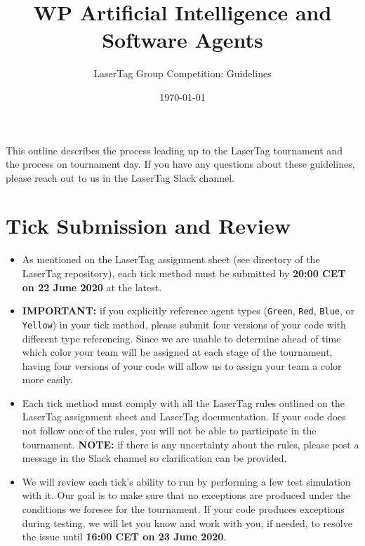 \documentclass[
    a4paper,
    english,
    DIV=16,
    11pt,
    parskip=half,
]{scrartcl}
\title{WP Artificial Intelligence and Software Agents}
\subtitle{LaserTag Group Competition: Guidelines}
\date{\today}
\begin{document}
\maketitle

This outline describes the process leading up to the LaserTag tournament and the process on tournament day. If you have any questions about these guidelines, please reach out to us in the LaserTag Slack channel.

\section*{Tick Submission and Review}
\begin{itemize}
    \item As mentioned on the LaserTag assignment sheet (see  directory of the LaserTag repository), each tick method must be submitted by \textbf{20:00 CET on 22 June 2020} at the latest.
    \item \textbf{IMPORTANT:} if you explicitly reference agent types (\texttt{Green}, \texttt{Red}, \texttt{Blue}, or \texttt{Yellow}) in your tick method, please submit four versions of your code with different type referencing. Since we are unable to determine ahead of time which color your team will be assigned at each stage of the tournament, having four versions of your code will allow us to assign your team a color more easily.
    \item Each tick method must comply with all the LaserTag rules outlined on the LaserTag assignment sheet and LaserTag documentation. If your code does not follow one of the rules, you will not be able to participate in the tournament. \textbf{NOTE:} if there is any uncertainty about the rules, please post a message in the Slack channel so clarification can be provided.
    \item We will review each tick's ability to run by performing a few test simulation with it. Our goal is to make sure that no exceptions are produced under the conditions we foresee for the tournament. If your code produces exceptions during testing, we will let you know and work with you, if needed, to resolve the issue until \textbf{16:00 CET on 23 June 2020}.
\end{itemize}
\end{document}
